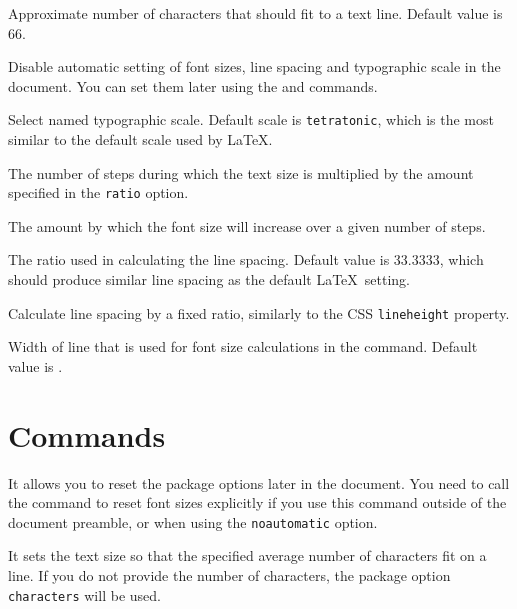 \documentclass{ltxdoc}
\newcommand\StartDescribe[1]{%
  \par\medskip\noindent\DescribeMacro#1
}
\begin{document}
\medskip

\noindent {} Approximate number of characters that should fit to a text line. Default value is 66.

\noindent {}  Disable automatic setting of font sizes, line spacing and typographic scale in the document. You can set them 
later using the \cmd{\setsizes} and \cmd{\ResponsiveSetup} commands.

\noindent {} Select named typographic scale. Default scale is
\texttt{tetratonic}, which is the most similar to the default scale used by
\LaTeX.

\noindent {} The number of steps during which the text size is multiplied by the amount specified in the \texttt{ratio} option.

\noindent {} The amount by which the font size will increase over a given number of steps.

\noindent {} The ratio used in calculating the line spacing. Default value is 33.3333, which should produce similar line spacing as the default \LaTeX\ setting.

\noindent {} Calculate line spacing by a fixed ratio, similarly to the CSS \texttt{lineheight} property.

\noindent {} Width of line that is used for font size calculations in the \cmd{\setsizes} command. Default value is \cmd{\textwidth}.




\section{Commands}

\StartDescribe\ResponsiveSetup
\cmd\ResponsiveSetup{}

\noindent It allows you to reset the package options later in the document. You
need to call the \cmd{\setsizes} command to reset font sizes explicitly if you use this command
outside of the document preamble, or when using the \texttt{noautomatic} option.

\StartDescribe\setsizes
\cmd\setsizes{}

\noindent It sets the text size so that the specified average number of
characters fit on a line. If you do not provide the number of characters, the
package option \texttt{characters} will be used.
\end{document}
